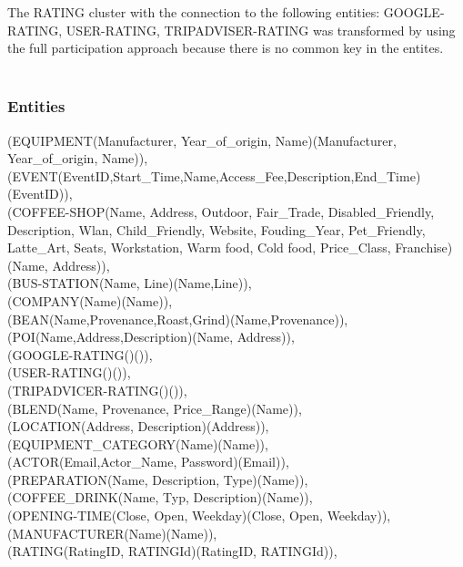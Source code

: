 The RATING cluster with the connection to the following entities: GOOGLE-RATING, USER-RATING, TRIPADVISER-RATING was transformed by using the full participation approach because there is no common key in the entites.\\\\
{ 
\subsubsection{Entities}
(EQUIPMENT(Manufacturer, Year\_of\_origin, Name)(Manufacturer, Year\_of\_origin, Name)),\\
(EVENT(EventID,Start\_Time,Name,Access\_Fee,Description,End\_Time)(EventID)),\\
(COFFEE-SHOP(Name, Address, Outdoor, Fair\_Trade, Disabled\_Friendly, Description, Wlan, Child\_Friendly, Website, Fouding\_Year, Pet\_Friendly, Latte\_Art, Seats, Workstation, Warm food, Cold food, Price\_Class, Franchise)(Name, Address)), \\
(BUS-STATION(Name, Line)(Name,Line)),\\
(COMPANY(Name)(Name)),\\
(BEAN(Name,Provenance,Roast,Grind)(Name,Provenance)),\\
(POI(Name,Address,Description)(Name, Address)), \\
(GOOGLE-RATING()()), \\
(USER-RATING()()), \\
(TRIPADVICER-RATING()()), \\
(BLEND(Name, Provenance, Price\_Range)(Name)), \\
(LOCATION(Address, Description)(Address)), \\
(EQUIPMENT\_CATEGORY(Name)(Name)), \\
(ACTOR(Email,Actor\_Name, Password)(Email)), \\
(PREPARATION(Name, Description, Type)(Name)), \\
(COFFEE\_DRINK(Name, Typ, Description)(Name)), \\
(OPENING-TIME(Close, Open, Weekday)(Close, Open, Weekday)), \\
(MANUFACTURER(Name)(Name)), \\
(RATING(RatingID, RATINGId)(RatingID, RATINGId)),  \\
}
